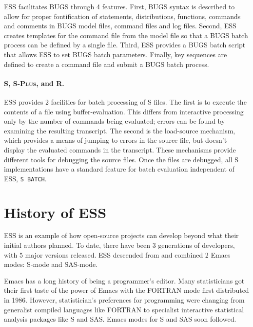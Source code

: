 \documentclass{article}
\newif\ifdraft
\newcommand*{\Splus}{\textsc{S-Plus}}
\newcommand{\stexttt}[1]{{\small\texttt{#1}}}
\newcommand{\emptyfig}{
\hspace*{42pt}\rule{324pt}{.25pt}\\
\hspace*{42pt}\rule{.25pt}{10pc}
\rule{316pt}{.25pt}
\rule{.25pt}{10pc}}
\begin{document}
ESS facilitates BUGS %
through 4 features.
First, BUGS syntax is described to allow for proper fontification
of statements, distributions, functions, commands and comments in BUGS
model files, command files and log files.  Second, ESS creates
templates for the command file from the model file so that a BUGS
batch process can be defined by a single file.  Third, ESS provides
a BUGS batch script that allows ESS to set BUGS batch parameters.
Finally, key sequences are defined to create a command file and submit 
a BUGS batch process.

\paragraph{S, \Splus, and R.}
ESS provides 2 facilities for batch processing of S files.  The first
is to execute the contents of a file using buffer-evaluation.  This
differs from interactive processing only by the number of commands
being evaluated; errors can be found by examining the resulting
transcript.  The second is the load-source mechanism, which provides a
means of jumping to errors in the source file, but doesn't display the
evaluated commands in the transcript.  These mechanisms provide
different tools for debugging the source files.  Once the files are
debugged, all S implementations have a standard feature for batch
evaluation independent of ESS, \stexttt{S BATCH}.

\section{History of ESS}
\label{sec:ESS:history}

ESS is an example of how open-source projects can develop beyond what
their initial authors planned.  To date, there have been 3 generations
of developers, with 5 major versions released.  ESS descended from and combined
2 Emacs modes: S-mode and SAS-mode.

Emacs has a long history of being a programmer's editor.  Many
statisticians got their first taste of the power of Emacs with the
FORTRAN mode first distributed in 1986. However, statistician's
preferences for programming were changing
from generalist compiled languages like FORTRAN to specialist interactive 
statistical analysis packages like S and SAS.  Emacs modes for S and SAS soon 
followed.
\end{document}
